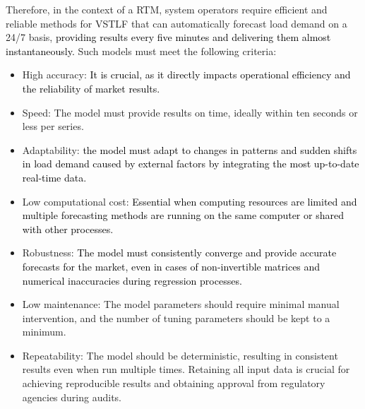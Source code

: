 \documentclass[journal, twoside]{IEEEtran}
\begin{document}
Therefore, in the context of a \ac{RTM}, system operators require efficient and reliable methods for \ac{VSTLF} that can automatically forecast load demand on a 24/7 basis, \textcolor{black}{providing results every five minutes and delivering them almost instantaneously.} Such models must meet the following criteria:
\begin{itemize}
    \item High accuracy: \textcolor{black}{It is crucial, as it directly impacts operational efficiency and the reliability of market results.} %
    \item Speed: The model must provide results on time, ideally within ten seconds or less per series.
    \item Adaptability: \textcolor{black}{the model must adapt to changes in patterns and sudden shifts in load demand caused by external factors by integrating the most up-to-date real-time data.}  %
    \item Low computational cost: \textcolor{black}{Essential when computing resources are limited and multiple forecasting methods are running on the same computer or shared with other processes.}  %
    \item Robustness: \textcolor{black}{The model must consistently converge and provide accurate forecasts for the market, even in cases of non-invertible matrices and numerical inaccuracies during regression processes.}  %
    \item Low maintenance: The model parameters should require minimal manual intervention, and the number of tuning parameters should be kept to a minimum.
    \item Repeatability: The model should be deterministic, resulting in consistent results even when run multiple times. Retaining all input data is crucial for achieving reproducible results and obtaining approval from regulatory agencies during audits. %
    \end{itemize}
    
\end{document}
